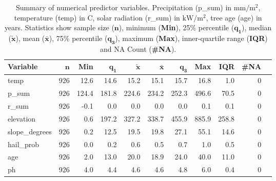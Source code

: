 \documentclass[review]{elsarticle}
\begin{document}
\begin{table}[H]
\centering
\begingroup\footnotesize
\begin{tabular}{lrrrrrrrrrr}
	\textbf{Variable} & $\mathbf{n}$ & \textbf{Min} & $\mathbf{q_1}$ & $\mathbf{\widetilde{x}}$ & $\mathbf{\bar{x}}$ & $\mathbf{q_3}$ & \textbf{Max} & \textbf{IQR} & \textbf{\#NA} \\
	\hline
	temp              & 926          & 12.6         & 14.6           & 15.2                     & 15.1               & 15.7           & 16.8         & 1.0          & 0             \\
	p\_sum            & 926          & 124.4        & 181.8          & 224.6                    & 234.2              & 252.3          & 496.6        & 70.5         & 0             \\
	r\_sum            & 926          & -0.1         & 0.0            & 0.0                      & 0.0                & 0.0            & 0.1          & 0.1          & 0             \\
	elevation         & 926          & 0.6          & 197.2          & 327.2                    & 338.7              & 455.9          & 885.9        & 258.8        & 0             \\
	slope\_degrees    & 926          & 0.2          & 12.5           & 19.5                     & 19.8               & 27.1           & 55.1         & 14.6         & 0             \\
	hail\_prob        & 926          & 0.0          & 0.2            & 0.6                      & 0.5                & 0.7            & 1.0          & 0.5          & 0             \\
	age               & 926          & 2.0          & 13.0           & 20.0                     & 18.9               & 24.0           & 40.0         & 11.0         & 0             \\
	ph                & 926          & 4.0          & 4.4            & 4.6                      & 4.6                & 4.8            & 6.0          & 0.4          & 0             \\
\end{tabular}
\endgroup
\caption{Summary of numerical predictor variables. Precipitation (p\_sum) in $\mathrm{mm/m^{2}}$, temperature (temp) in \degree C, solar radiation (r\_sum) in $\mathrm{kW/m^{2}}$, tree age (age) in years. Statistics show sample size ($\mathbf{n}$), minimum (\textbf{Min}), 25\% percentile ($\mathbf{q_1}$), median ($\mathbf{\widetilde{x}}$), mean ($\mathbf{\bar{x}}$), 75\% percentile ($\mathbf{q_3}$), maximum (\textbf{Max}), inner-quartile range (\textbf{IQR}) and NA Count (\textbf{\#NA}).}
\label{table:descriptive_summary_numeric}
\end{table}
\end{document}
